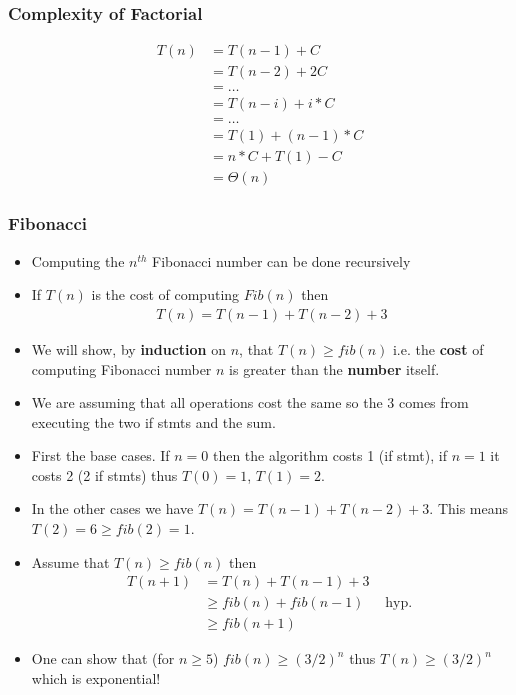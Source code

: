 \documentclass{beamer}
\begin{document}
\begin{frame}
  \frametitle{Complexity of Factorial}
  \begin{align*}
    T(n)&=T(n-1)+C\\
        &=T(n-2)+2C\\
        &=\ldots \\
        &=T(n-i)+i*C\\
        &=\ldots \\
        &=T(1)+(n-1)*C\\
        &=n*C+T(1)-C\\
        &=\Theta(n)
  \end{align*}
\end{frame}
\begin{frame}
  \frametitle{Fibonacci}
  \begin{itemize}
  \item Computing the $n^{th}$ Fibonacci number can be done
    recursively 
 
\begin{function}[H]
 \DontPrintSemicolon
  \BlankLine


  \end{function}
\item If $T(n)$ is the cost of computing $Fib(n)$ then
  \begin{align*}
    T(n)=T(n-1)+T(n-2)+3
  \end{align*}
\item We will show, by \textbf{induction} on $n$, that $T(n)\ge fib(n)$
  i.e. the \textbf{cost} of computing Fibonacci number $n$ is greater
  than the \textbf{number} itself.
 \end{itemize}
\end{frame}
\begin{frame}
  \begin{itemize}
  \item We are assuming that all operations cost the same so the 3
    comes from executing the two if stmts and the sum.
\item First the base cases. If $n=0$ then the algorithm costs 1 (if
  stmt), if $n=1$ it costs 2 (2 if stmts) thus
    $T(0)=1$, $T(1)=2$.
\item In the other cases we have $T(n)=T(n-1)+T(n-2)+3$. This means
  $T(2)=6 \ge fib(2)=1$.
\item Assume that $T(n)\ge fib(n)$ then
  \begin{align*}
    T(n+1)&=T(n)+T(n-1)+3 & \\
          &\ge fib(n)+fib(n-1) & \text{ hyp. }\\
          &\ge fib(n+1)
  \end{align*}
\item One can show that (for $n\ge 5$) $fib(n)\ge (3/2)^n$ thus $T(n)\ge (3/2)^n$
  which is exponential!
  \end{itemize}
\end{frame}
\end{document}

